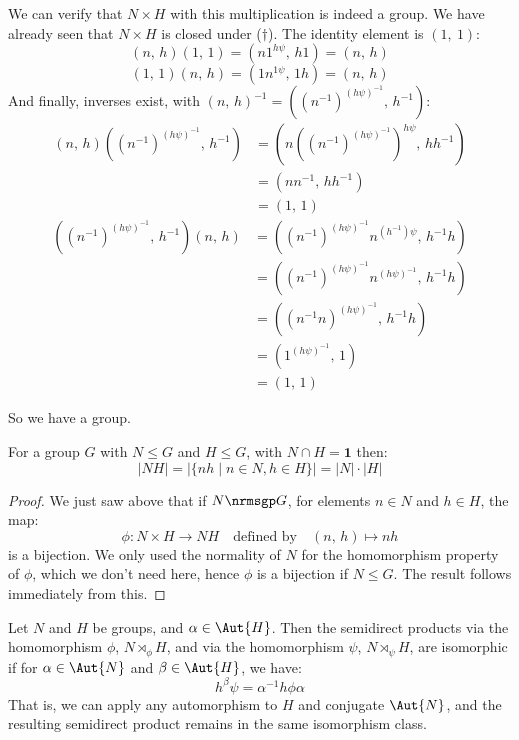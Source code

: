 We can verify that \(N {\times} H\) with this multiplication is indeed a group.
We have already seen that \(N {\times} H\) is closed under (\(\dagger\)).
The identity element is \((1,\ 1)\):
\[ (n,\, h)(1,\, 1) =  (n 1^{h\psi},\, h 1) = (n,\, h)\]
\[ (1,\, 1)(n,\, h) =  (1 n^{1\psi},\, 1 h) = (n,\, h)\]
And finally, inverses exist, with \({(n,\, h)}^{-1} = \left({(n^{-1})}^{{(h\psi)}^{-1}},\, h^{-1}\right)\):
\begin{align*}
    (n,\, h)\left({(n^{-1})}^{{(h\psi)}^{-1}},\, h^{-1}\right)
    &= \left(n {\left({(n^{-1})}^{{(h\psi)}^{-1}}\right)}^{h\psi},\, hh^{-1} \right) \\
    &= (n n^{-1},\, h h^{-1}) \\
    &= (1,\, 1)
\end{align*}
\begin{align*}
    \left({(n^{-1})}^{{(h\psi)}^{-1}},\, h^{-1}\right)(n,\, h)
    &= \left({(n^{-1})}^{{(h\psi)}^{-1}} n^{(h^{-1})\psi},\, h^{-1} h \right) \\
    &= \left({(n^{-1})}^{{(h\psi)}^{-1}} n^{{(h\psi)}^{-1}},\, h^{-1} h \right) \\
    &= \left({(n^{-1} n)}^{{(h\psi)}^{-1}},\, h^{-1} h \right)  \\
    &= \left(1^{{(h\psi)}^{-1}},\, 1 \right) \\
    &= (1,\, 1)
\end{align*}

So we have a group.

\begin{lemma}\label{lem:setprodorder}
    \raggedright
    For a group \(G\) with \(N \leqslant G\) and \(H \leqslant G\), with \(N \cap H = \bm{1}\) then:
    \[|NH| = |\{nh \mid n \in N, h \in H\}| = |N| \cdot |H|\]
\end{lemma}

\begin{proof}
    We just saw above that if \(N \nrmsgp G\), for elements \(n \in N\) and \(h \in H\), the map:
    \[\phi:N \times H \to NH \quad \text{defined by} \quad (n,\,h) \mapsto nh\]
    is a bijection.
    We only used the normality of \(N\) for the homomorphism property of \(\phi\), which we don't need here, hence
    \(\phi\) is a bijection if \(N \leqslant G\).
    The result follows immediately from this.
\end{proof}

\begin{lemma}\label{lem:semiisom}
    \raggedright
    Let \(N\) and \(H\) be groups, and \(\alpha \in \Aut{H}\).
    Then the semidirect products via the homomorphism \(\phi\), \(N \rtimes_\phi H\), and via the homomorphism
    \(\psi\), \(N \rtimes_\psi H\), are isomorphic if for \(\alpha \in \Aut{N}\) and \(\beta \in \Aut{H}\), we have:
    \[h^\beta\psi = \alpha^{-1}h\phi\alpha \tag{for all \(h \in H\)}\]
    That is, we can apply any automorphism to \(H\) and conjugate \(\Aut{N}\), and the resulting semidirect product remains in
    the same isomorphism class.
\end{lemma}

